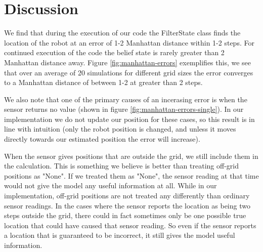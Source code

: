 \documentclass{article}
\begin{document}
\FloatBarrier
\section{Discussion}

We find that during the execution of our code the FilterState class finds the location of the robot at an error of 1-2 Manhattan distance within 1-2 steps. For continued execution of the code the belief state is rarely greater than 2 Manhattan distance away. Figure \ref{fig:manhattan-errors} exemplifies this, we see that over an average of 20 simulations for different grid sizes the error converges to a Manhattan distance of between 1-2 at greater than 2 steps.

We also note that one of the primary causes of an incerasing error is when the sensor returns no value (shown in figure \ref{fig:manhattan-errors-single}). In our implementation we do not update our position for these cases, so this result is in line with intuition (only the robot position is changed, and unless it moves directly towards our estimated position the error will increase).

When the sensor gives positions that are outside the grid, we still include them in the calculation. This is something we believe is better than treating off-grid positions as "None". If we treated them as "None", the sensor reading at that time would not give the model any useful information at all. While in our implementation, off-grid positions are not treated any differently than ordinary sensor readings. In the cases where the sensor reports the location as being two steps outside the grid, there could in fact sometimes only be one possible true location that could have caused that sensor reading.
So even if the sensor reports a location that is guaranteed to be incorrect, it still gives the model useful information.



\end{document}
